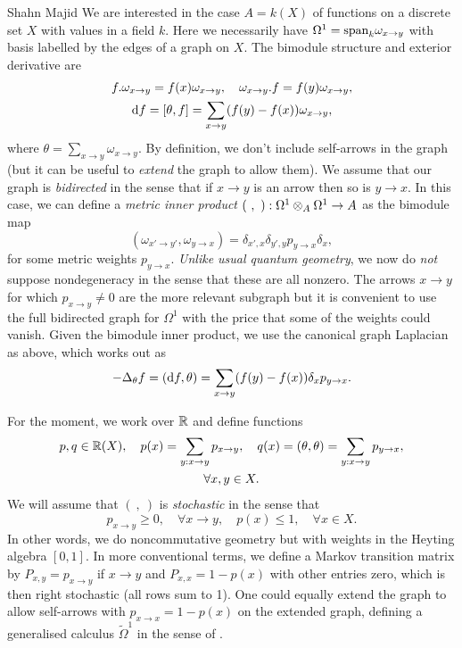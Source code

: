 \begin{artengenv}{Shahn Majid}
We are interested in the case $A=k(X)$ of functions on a discrete set $X$ with values in a field $k$. Here we necessarily have $\Omega^1={\rm span}_k\omega_{x\to y}$ with basis labelled by the edges of a graph on $X$. The bimodule structure and exterior derivative are
\begin{equation*}
   \begin{gathered}
   f.\omega_{x\to y}=f(x)\omega_{x\to y},\quad \omega_{x\to y}.f=f(y)\omega_{x\to y},\\
   {\rm d} f=[\theta,f]=\sum_{x\to y} (f(y)-f(x))\omega_{x\to y},
   \end{gathered}
\end{equation*}
where $\theta=\sum_{x\to y}\omega_{x\to y}$. By definition, we don't include self-arrows in the graph (but it can be useful to {\em extend} the graph to allow them). We assume that our graph is {\em bidirected} in the sense that if $x\to y$ is an arrow then so is $y\to x$. In this case, we can define a {\em metric inner product} $(\ ,\ ):\Omega^1\otimes_A\Omega^1\to A$ as the bimodule map
\[ (\omega_{x'\to y'},\omega_{y\to x})=\delta_{x',x}\delta_{y',y}p_{y\to x}\delta_x,\]
for some metric weights $p_{y\to x}$. {\em Unlike usual quantum geometry}, we now do {\em not} suppose nondegeneracy in the sense that these are all nonzero. The arrows $x\to y$ for which $p_{x\to y}\ne 0$ are the more relevant subgraph but it is convenient to use the full bidirected graph for $\Omega^1$ with the price that some of the weights could vanish. Given the bimodule inner product, we use the canonical graph Laplacian \parencite{Ma:gra} as above, which works out as
\begin{equation}\label{delth} -\Delta_\theta f=(\extd f,\theta)=\sum_{x\to y} (f(y)-f(x))\delta_x p_{y\to x}.\end{equation}

For the moment, we work over ${\mathbb{R}}$ and define functions
\begin{equation*}
   \begin{gathered}
   p,q\in {\mathbb{R}}(X),\quad p(x)=\sum_{y:x\to y} p_{x\to y},\quad q(x)=(\theta,\theta)=\sum_{y:x\to y} p_{y\to x},\\ \forall x,y\in X.
   \end{gathered}
\end{equation*}
We will assume that $(\ , \ )$ is {\em stochastic} in the sense that
\[ p_{x\to y}\ge 0,\quad \forall x\to y,\quad p(x)\le 1,\quad \forall x\in X.\]
In other words, we do noncommutative geometry but with weights in the Heyting algebra $[0,1]$. In more conventional terms, we define a Markov transition matrix by $P_{x,y}=p_{x\to y}$ if $x\to y$ and $P_{x,x}=1-p(x)$ with other entries zero, which is then right stochastic (all rows sum to 1). One could equally extend the graph to allow self-arrows with $p_{x\to x}=1-p(x)$ on the extended graph, defining a generalised calculus $\tilde\Omega^1$ in the sense of \parencite{MaTao:dua}. 


\end{artengenv}
